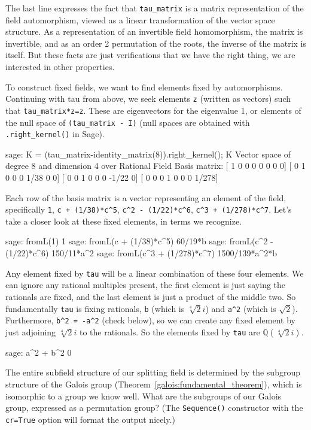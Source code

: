 %
The last line expresses the fact that \verb?tau_matrix? is a matrix representation of the field automorphism, viewed as a linear transformation of the vector space structure.  As a representation of an invertible field homomorphism, the matrix is invertible, and as an order 2 permutation of the roots, the inverse of the matrix is itself.  But these facts are just verifications that we have the right thing, we are interested in other properties.\par
%
To construct fixed fields, we want to find elements fixed by automorphisms.  Continuing with tau from above, we seek elements \verb?z? (written as vectors) such that \verb?tau_matrix*z=z?.  These are eigenvectors for the eigenvalue 1, or elements of the null space of \verb?(tau_matrix - I)? (null spaces are obtained with \verb?.right_kernel()? in Sage).
%
\begin{sageexample}
sage: K = (tau_matrix-identity_matrix(8)).right_kernel(); K
Vector space of degree 8 and dimension 4 over Rational Field
Basis matrix:
[    1     0     0     0     0     0     0     0]
[    0     1     0     0     0  1/38     0     0]
[    0     0     1     0     0     0 -1/22     0]
[    0     0     0     1     0     0     0 1/278]
\end{sageexample}
%
Each row of the basis matrix is a vector representing an element of the field, specifically \verb?1?, \verb?c + (1/38)*c^5?, \verb?c^2 - (1/22)*c^6?, \verb?c^3 + (1/278)*c^7?.  Let's take a closer look at these fixed elements, in terms we recognize.
%
\begin{sageexample}
sage: fromL(1)
1
sage: fromL(c + (1/38)*c^5)
60/19*b
sage: fromL(c^2 - (1/22)*c^6)
150/11*a^2
sage: fromL(c^3 + (1/278)*c^7)
1500/139*a^2*b
\end{sageexample}
%
Any element fixed by \verb?tau? will be a linear combination of these four elements.  We can ignore any rational multiples present, the first element is just saying the rationals are fixed, and the last element is just a product of the middle two.  So fundamentally \verb?tau? is fixing rationals, \verb?b? (which is $\sqrt[4]{2}i$) and \verb?a^2? (which is $\sqrt{2}$).  Furthermore, \verb?b^2 = -a^2? (check below), so we can create any fixed element by just adjoining $\sqrt[4]{2}i$ to the rationals.  So the elements fixed by \verb?tau? are ${\mathbb Q}(\sqrt[4]{2}i)$.
%
\begin{sageexample}
sage: a^2 + b^2
0
\end{sageexample}
%
%
%
The entire subfield structure of our splitting field is determined by the subgroup structure of the Galois group (Theorem~\ref{galois:fundamental_theorem}), which is isomorphic to a group we know well.  What are the subgroups of our Galois group, expressed as a permutation group? (The \verb?Sequence()? constructor with the \verb?cr=True? option will format the output nicely.)
